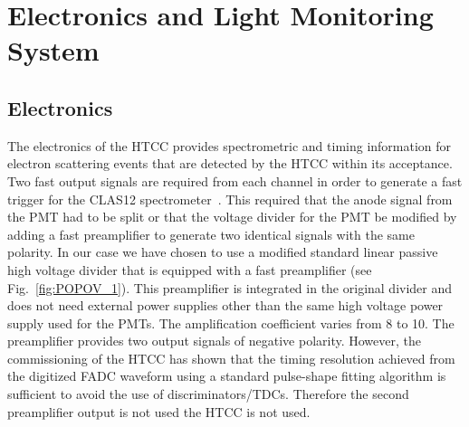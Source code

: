 \section{Electronics and Light Monitoring System}

\subsection{Electronics}

The electronics of the HTCC provides spectrometric and timing information for electron scattering events that
are detected by the HTCC within its acceptance. Two fast output signals are required from each channel in order
to generate a fast trigger for the CLAS12 spectrometer~\cite{trigger-nim}. This required that the anode signal
from the PMT had to be split or that the voltage divider for the PMT be modified by adding a fast preamplifier to
generate two identical signals with the same polarity. In our case we have chosen to use a modified standard linear
passive high voltage divider that is equipped with a fast preamplifier (see Fig.~\ref{fig:POPOV_1}). This preamplifier
is integrated in the original divider and does not need external power supplies other than the same high voltage
power supply used for the PMTs. The amplification coefficient varies from 8 to 10. The preamplifier provides two
output signals of negative polarity. However, the commissioning of the HTCC has shown that the timing resolution
achieved from the digitized FADC waveform using a standard pulse-shape fitting algorithm is sufficient to avoid the
use of discriminators/TDCs. Therefore the second preamplifier output is not used the HTCC is not used.

